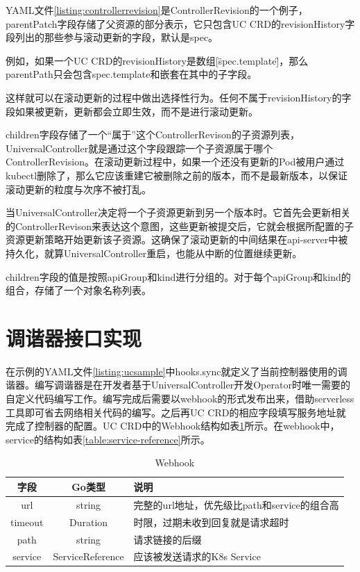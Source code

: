 \documentclass[macfonts,master]{njuthesis}
\begin{document}
YAML文件\ref{listing:controllerrevision}是ControllerRevision的一个例子，parentPatch字段存储了父资源的部分表示，它只包含UC CRD的revisionHistory字段列出的那些参与滚动更新的字段，默认是spec。

例如，如果一个UC CRD的revisionHistory是数组[\"spec.template\"]，那么parentPath只会包含spec.template和嵌套在其中的子字段。

这样就可以在滚动更新的过程中做出选择性行为。任何不属于revisionHistory的字段如果被更新，更新都会立即生效，而不是进行滚动更新。

children字段存储了一个``属于''这个ControllerRevison的子资源列表，UniversalController就是通过这个字段跟踪一个子资源属于哪个ControllerRevision。在滚动更新过程中，如果一个还没有更新的Pod被用户通过kubectl删除了，那么它应该重建它被删除之前的版本，而不是最新版本，以保证滚动更新的粒度与次序不被打乱。

当UniversalController决定将一个子资源更新到另一个版本时。它首先会更新相关的ControllerRevison来表达这个意图，这些更新被提交后，它就会根据所配置的子资源更新策略开始更新该子资源。这确保了滚动更新的中间结果在api-server中被持久化，就算UniversalController重启，也能从中断的位置继续更新。

children字段的值是按照apiGroup和kind进行分组的。对于每个apiGroup和kind的组合，存储了一个对象名称列表。
\section{调谐器接口实现}
在示例的YAML文件\ref{listing:ucsample}中hooks.sync就定义了当前控制器使用的调谐器。编写调谐器是在开发者基于UniversalController开发Operator时唯一需要的自定义代码编写工作。编写完成后需要以webhook的形式发布出来，借助serverless工具即可省去网络相关代码的编写。之后再UC CRD的相应字段填写服务地址就完成了控制器的配置。UC CRD中的Webhook结构如表\ref{table:webhook}所示。在webhook中，service的结构如表\ref{table:service-reference}所示。

\begin{table}
  \centering
  \begin{tabular}{ccp{50mm}}
    \toprule
    \textbf{字段} & \textbf{Go类型} & \textbf{说明} \\
    \midrule
    url  & string  & 完整的url地址，优先级比path和service的组合高\\
    timeout  & Duration   &  时限，过期未收到回复就是请求超时 \\
    path     & string  &  请求链接的后缀 \\
    service    & ServiceReference   &  应该被发送请求的K8s Service \\
    \bottomrule
  \end{tabular}
  \caption{Webhook}\label{table:webhook}
\end{table}
\end{document}
